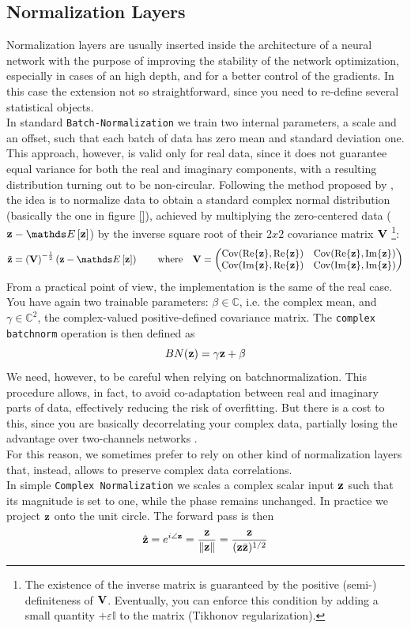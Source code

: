 \documentclass[../main.tex]{subfiles}
\begin{document}
\subsection*{Normalization Layers}
Normalization layers are usually inserted inside the architecture of a neural network with the purpose of improving the stability of the network optimization, especially in cases of an high depth, and for a better control of the gradients. In this case the extension not so straightforward, since you need to re-define several statistical objects.\\
In standard \texttt{Batch-Normalization} we train two internal parameters, a scale and an offset, such that each batch of data has zero mean and standard deviation one. This approach, however, is valid only for real data, since it does not guarantee equal variance for both the real and imaginary components, with a resulting distribution turning out to be non-circular. Following the method proposed by \cite{trabelsi2018deep}, the idea is to normalize data to obtain a standard complex normal distribution (basically the one in figure \ref{}), achieved by multiplying the zero-centered data ($\vb{z}-\Ev{\vb{z}}$) by the inverse square root of their $2x2$ covariance matrix $\vb{V}$ \footnote{The existence of the inverse matrix is guaranteed by the positive (semi-) definiteness of $\vb{V}$. Eventually, you can enforce this condition by adding a small quantity $+\varepsilon\mathds{I}$ to the matrix (Tikhonov regularization).}:
\begin{equation}
\tilde{\vb{z}} = \left(\vb{V}\right)^{-\frac{1}{2}}\left(\vb{z}-\Ev{\vb{z}}\right) \qquad\text{where}\quad \vb{V} =  \mqty(\Cov(\Re{\vb{z}}, \Re{\vb{z}}) & \Cov(\Re{\vb{z}}, \Im{\vb{z}}) \\ \Cov(\Im{\vb{z}}, \Re{\vb{z}}) & \Cov(\Im{\vb{z}}, \Im{\vb{z}}))
\label{eq:cmplx_batchnorm}
\end{equation}
From a practical point of view, the implementation is the same of the real case. You have again two trainable parameters: $\beta\in\mathds{C}$, i.e. the complex mean, and $\gamma\in\mathds{C}^2$, the complex-valued positive-defined covariance matrix. The \texttt{complex batchnorm} operation is then defined as
\[ BN(\vb{z}) = \gamma\vb{z} + \beta \]
We need, however, to be careful when relying on batchnormalization. This procedure allows, in fact, to avoid co-adaptation between real and imaginary parts of data, effectively reducing the risk of overfitting. But there is a cost to this, since you are basically decorrelating your complex data, partially losing the advantage over two-channels networks \cite{cogswell2016reducing}.\\
For this reason, we sometimes prefer to rely on other kind of normalization layers that, instead, allows to preserve complex data correlations.\\
In simple \texttt{Complex Normalization} we scales a complex scalar input $\vb{z}$ such that its magnitude is set to one, while the phase remains unchanged. In practice we project $\vb{z}$ onto the unit circle. The forward pass is then
\[ \hat{\vb{z}} = e^{i\angle \vb{z}} = \frac{\vb{z}}{\norm{\vb{z}}} = \frac{\vb{z}}{(\vb{z}\bar{\vb{z}})^{1/2}} \]
\end{document}
